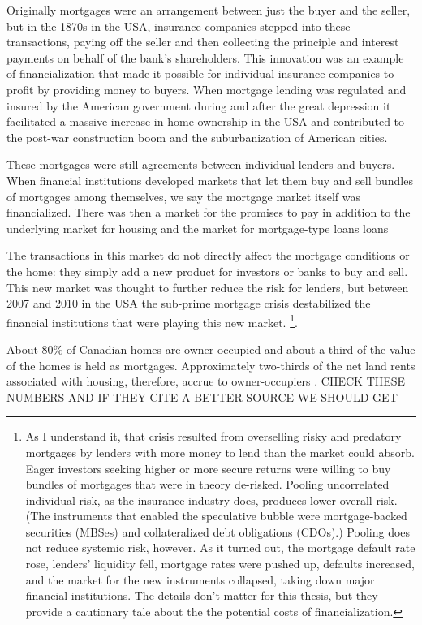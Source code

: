 Originally mortgages were an arrangement between just the buyer and the seller, but in the 1870s in the USA, insurance companies stepped into these transactions, paying off the seller and then collecting the principle and interest payments on behalf of the bank's shareholders. This innovation was an example of financialization that made it possible for individual insurance companies to profit by providing money to buyers. When mortgage lending was regulated and insured  by the American government during and after the great depression it facilitated a massive increase in home ownership in the USA and contributed to the post-war construction boom and the suburbanization of American cities. 

These mortgages were still agreements between individual lenders and buyers. When financial institutions developed markets that let them buy and sell bundles of mortgages among themselves, we say the mortgage market itself was financialized. There was then a market for the  promises to pay in addition to the underlying market for housing and the market for mortgage-type loans loans

The transactions in this market do not directly affect the mortgage conditions or the home: they simply add a new product for investors or banks to buy and sell. This new market was thought to further reduce the risk for lenders, but  between 2007 and 2010 in the USA the sub-prime mortgage crisis destabilized the financial institutions that were playing this new market. \footnote{As I understand it, that crisis resulted from overselling risky and predatory mortgages by lenders with more money to lend than the market could absorb. Eager investors seeking higher or more secure returns were willing  to buy bundles of  mortgages that were in theory de-risked. Pooling uncorrelated individual risk, as the insurance industry does, produces lower overall risk. (The instruments that enabled the speculative bubble were mortgage-backed securities (MBSes) and collateralized debt obligations (CDOs).) Pooling does not reduce systemic risk, however. As it turned out, the mortgage default rate rose, lenders' liquidity fell, mortgage rates were pushed up, defaults increased, and the market for the new instruments collapsed, taking down major financial institutions. The details don't matter for this thesis, but they provide a cautionary tale about the the potential costs of financialization.}.  

About 80\% of Canadian homes are owner-occupied and about a third of the value of the homes is held as mortgages. Approximately two-thirds of the net land rents associated with housing, therefore, accrue to owner-occupiers \cite{nemtinFinancializationHousingSocial2021}. {\color {red}CHECK THESE NUMBERS AND IF THEY CITE A BETTER SOURCE WE SHOULD GET} 

